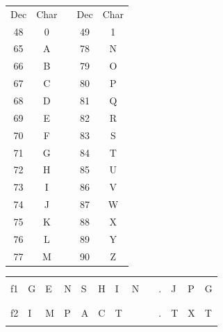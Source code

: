 \documentclass[11pt,a4paper]{article}
\begin{document}
\begin{table}[ht!]
  \centering
  \begin{minipage}{0.3\textwidth}
    \centering

\begin{tabular}{ |c|c| m{0.3cm} |c|c| }
\cline{1-2} \cline{4-5}
Dec & Char &   & Dec & Char \\
\cline{1-2} \cline{4-5}
48 & 0 &  & 49 & 1 \\
\cline{1-2} \cline{4-5}
65 & A &  & 78 & N \\
66 & B &  & 79 & O \\
67 & C &  & 80 & P \\
68 & D &  & 81 & Q \\
69 & E &  & 82 & R \\
70 & F &  & 83 & S \\
71 & G &  & 84 & T \\
72 & H &  & 85 & U \\
73 & I &  & 86 & V \\
74 & J &  & 87 & W \\
75 & K &  & 88 & X \\
76 & L &  & 89 & Y \\
77 & M &  & 90 & Z \\
\cline{1-2} \cline{4-5}
\end{tabular}

  \end{minipage}
  \hfillx
  \begin{minipage}{0.65\textwidth}
    \centering

\begin{tabular}{ c   | m{0.45cm} | m{0.45cm} | m{0.45cm} | m{0.45cm} | m{0.45cm} | m{0.45cm} | m{0.45cm} | m{0.45cm} | c | m{0.45cm} | m{0.45cm} | m{0.45cm} | }
\cline{2-9} \cline{11-13}
 & & & & & & & & &   & & & \\
f1   & G & E & N & S & H & I & N & &  . & J & P & G \\
 & & & & & & & & &   & & & \\
\cline{2-9} \cline{11-13}
 & & & & & & & & &   & & & \\
f2   & I & M & P & A & C & T & & &  .  & T & X & T \\
 & & & & & & & & &   & & & \\
\cline{2-9} \cline{11-13}
\end{tabular}

  \end{minipage}
\end{table}
\end{document}
